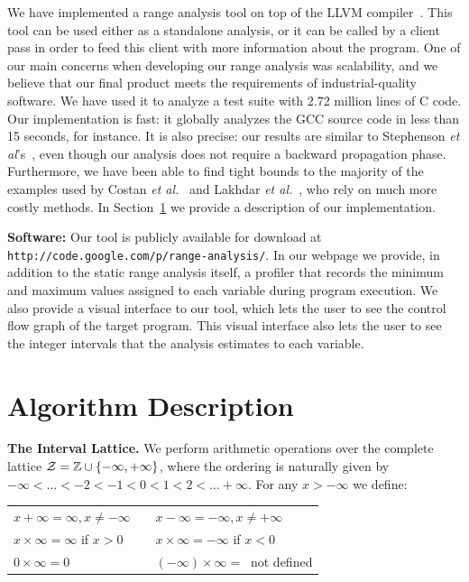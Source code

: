 \documentclass{paper}
\begin{document}
We have implemented a range analysis tool on top of the LLVM
compiler~\cite{Lattner04}.
This tool can be used either as a standalone analysis, or it can be called by a
client pass in order to feed this client with more information about the
program.
One of our main concerns when developing our range analysis was scalability,
and we believe that our final product meets the requirements of
industrial-quality software.
We have used it to analyze a test suite with 2.72 million lines of C code.
Our implementation is fast: it globally analyzes the GCC source code in less than
15 seconds, for instance. 
It is also precise: our results are similar to Stephenson
{\em et al}'s~\cite{Stephenson00}, even though our analysis does not require
a backward propagation phase.
Furthermore, we have been able to find tight bounds to the majority of the
examples used by Costan {\em et al.}~\cite{Costan05} and Lakhdar
{\em et al.}~\cite{Lakhdar11}, who rely on much more costly methods.
In Section~\ref{sec:dsc} we provide a description of our implementation.

\noindent
\textbf{Software: }
Our tool is publicly available for
download at \texttt{http://code.google.com/p/range-analysis/}.
In our webpage we provide, in addition to the static range analysis itself,
a profiler that records the minimum and maximum values assigned to each
variable during program execution.
We also provide a visual interface to our tool, which lets the user to
see the control flow graph of the target program.
This visual interface also lets the user to see the integer intervals that
the analysis estimates to each variable.


\section{Algorithm Description}
\label{sec:dsc}

\noindent
\textbf{The Interval Lattice.}
We perform arithmetic operations over the complete lattice
$\cal{Z} = \mathbb{Z} \cup \{-\infty, +\infty\}$, where the ordering is
naturally given by $-\infty < \ldots < -2 < -1 < 0 < 1 < 2 < \ldots +\infty$.
For any $x > -\infty$ we define:

\begin{tabular}{lcl}
$x + \infty = \infty, x \neq -\infty$ & \mbox{\hspace{0.1cm}} & $x - \infty = - \infty, x \neq +\infty$ \\
$x \times \infty = \infty$ if $x > 0$ & & $x \times \infty = -\infty$ if $x < 0$ \\
$0 \times \infty = 0$ & & $(-\infty) \times \infty = \ $ not defined  \\
\end{tabular}
\end{document}
